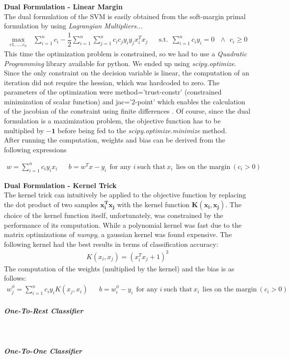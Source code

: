 \documentclass[12pt]{article}
\begin{document}
	\textbf{Dual Formulation - Linear Margin}\\
	The dual formulation of the SVM is easily obtained from the soft-margin primal formulation by using \textit{Lagrangian Multipliers...}
	\begin{align}
		\max_{c1,\dots, c_n}\ \ \ \sum_{i=1}^n{c_i} - \dfrac 1 2 \sum_{i=1}^n{\sum_{j=1}^n{c_i c_j y_i y_j x_i^Tx_j}} &&
		\nonumber \text{s.t.} \ \ \sum_{i=1}^n{c_iy_i} = 0\ \ \ \land \ \ c_i \ge 0
	\end{align}
	This time the optimization problem is constrained, so we had to use a \textit{Quadratic Programming} library available for python. We ended up using \textit{scipy.optimize}. Since the only constraint on the decision variable is linear, the computation of an iteration did not require the hessian, which was hardcoded to zero. The parameters of the optimization were method='trust-constr' (constrained minimization of scalar function) and jac='2-point' which enables the calculation of the jacobian of the constraint using finite differences \cite{docscipyopt}. Of course, since the dual formulation is a maximization problem, the objective function has to be multiplied by $\mathbf{-1}$ before being fed to the \textit{scipy.optimize.minimize} method.\\
	
	After running the computation, weights and bias can be derived from the following expressions
	
	\begin{align}
		w = \sum_{i=1}^n{c_iy_ix_i}&&
		b = w^Tx-y_i \ \ \text{for any } i\ \text{such that}\ x_i\ \ \text{lies on the margin}\  (c_i>0)
	\end{align}
	
	\textbf{Dual Formulation - Kernel Trick}\\
	The kernel trick can intuitively be applied to the objective function by replacing the dot product of two samples $\mathbf{x_i^Tx_j}$ with the kernel function $\mathbf{K(x_i,x_j)}$. The choice of the kernel function itself, unfortunately, was constrained by the performance of its computation. While a polynomial kernel was fast due to the matrix optimizations of \textit{numpy}, a gaussian kernel was found expensive. The following kernel had the best results in terms of classification accuracy:
	\begin{align}
		K(x_i,x_j)=(x_i^Tx_j+1)^3
	\end{align}
	The computation of the weights (multiplied by the kernel) and the bias is as follows:
	\begin{align}
		w_j^\phi = \sum_{i=1}^n{c_iy_iK(x_j,x_i)}&&
		b = w^\phi_i-y_i \ \ \text{for any } i\ \text{such that}\ x_i\ \ \text{lies on the margin}\  (c_i>0)
	\end{align}
	\subparagraph{One-To-Rest Classifier}\mbox{}\\\newline
	\subparagraph{One-To-One Classifier}\mbox{}\\\newline
	
	\printbibliography
\end{document}

